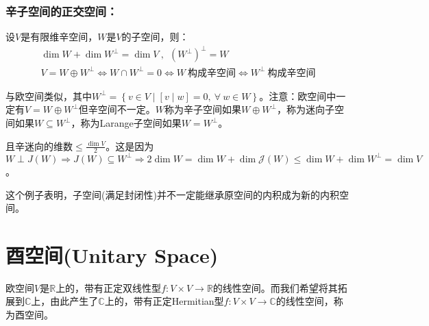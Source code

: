 \documentclass[zihao=5,UTF8]{report}
\theoremstyle{mystyle} %
\begin{document}
\subsubsection{辛子空间的正交空间：}
设$V$是有限维辛空间，$W$是$V$的子空间，则：
\begin{gather*}
    \dim W + \dim W^{\perp} = \dim V\ , \ \ (W^{\perp})^{\perp} = W\\
    V = W \oplus W^{\perp} \Longleftrightarrow  W \cap  W^{\perp} = {0} \Longleftrightarrow W\ \text{构成辛空间} \Longleftrightarrow W^{\perp}\ \text{构成辛空间} 
\end{gather*}
{\par\color{gray}\small
与欧空间类似，其中$W^{\perp} = \left\{v \in V\mid [v\mid w] = 0,\ \forall\ w \in W \right\}$。注意：欧空间中一定有$V = W \oplus W^{\perp}$但辛空间不一定。$W$称为辛子空间如果$W \oplus W^{\perp}$，称为迷向子空间如果$ W \subseteq W^{\perp}$，称为Larange子空间如果$W = W^{\perp}$。\par
且辛迷向的维数$\le \frac{\dim V}{2}$。这是因为$W \perp J(W) \Longrightarrow J(W) \subseteq W^{\perp} \Longrightarrow 2\dim W = \dim W + \dim \mathcal{J}(W) \le \dim W + \dim W^{\perp} = \dim V$。\par
这个例子表明，子空间(满足封闭性)并不一定能继承原空间的内积成为新的内积空间。
\par}

\section{酉空间(Unitary Space)}
{\par\color{gray}\small
欧空间$V$是$\mathbb{R}$上的，带有正定双线性型$f:V\times V \longrightarrow \mathbb{R}$的线性空间。而我们希望将其拓展到$\mathbb{C}$上，由此产生了$\mathbb{C}$上的，带有正定Hermitian型$f:V\times V \longrightarrow \mathbb{C}$的线性空间，称为酉空间。
\par}
\end{document}
